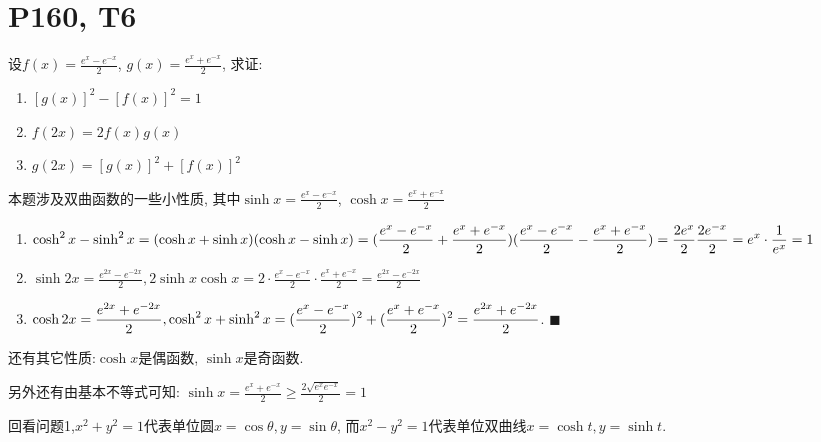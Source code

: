 \documentclass{book}
\begin{document}
    \section{\textcolor[rgb]{0.11,0.65,0.52}{P160, T6}}
    \begin{boxB}
        设$\displaystyle f(x)=\frac{e^x-e^{-x}}{2}$, $\displaystyle g(x)=\frac{e^x+e^{-x}}{2}$, 求证:\par
    \begin{enumerate}
        \item $[g(x)]^2-[f(x)]^2=1$
        \item $f(2x)=2f(x)g(x)$
        \item $g(2x)=[g(x)]^2+[f(x)]^2$
    \end{enumerate}
    \end{boxB}
        本题涉及\textcolor[rgb]{0.38,0.11,0.2}{双曲函数}的一些小性质, 其中$\displaystyle \sinh x = \frac{e^x-e^{-x}}{2}$, $\displaystyle \cosh x = \frac{e^x+e^{-x}}{2}$
    \begin{enumerate}
        \item $\displaystyle \cosh^2 x-\sinh^2x=(\cosh x+\sinh x)(\cosh x-\sinh x)\\=(\frac{e^x-e^{-x}}{2}+\frac{e^x+e^{-x}}{2})(\frac{e^x-e^{-x}}{2}-\frac{e^x+e^{-x}}{2})=\frac{2e^x}{2}\frac{2e^{-x}}{2}=e^x\cdot \frac{1}{e^x}=1$
        \item $\displaystyle \sinh 2x=\frac{e^{2x}-e^{-2x}}{2}, 2\sinh x \cosh x=2\cdot \frac{e^x-e^{-x}}{2}\cdot \frac{e^x+e^{-x}}{2}=\frac{e^{2x}-e^{-2x}}{2}$
        \item $\displaystyle \cosh 2x=\frac{e^{2x}+e^{-2x}}{2}, \cosh^2x+\sinh^2x=(\frac{e^x-e^{-x}}{2})^2+ (\frac{e^x+e^{-x}}{2})^2\\=\frac{e^{2x}+e^{-2x}}{2}$. $\blacksquare$
    \end{enumerate}

    还有其它性质:$\cosh x$是偶函数, $\sinh x$是奇函数. 
        
    另外还有由\textcolor[rgb]{0.75,0.17,0.22}{基本不等式}可知: $\displaystyle \sinh x=\frac{e^x+e^{-x}}{2} \ge \frac{2\sqrt{e^xe^{-x}}}{2}=1$

    \textcolor[rgb]{0.38,0.11,0.2}{回看问题1,$x^2+y^2=1$代表单位圆$x=\cos \theta, y=\sin \theta$, 而$x^2-y^2=1$代表单位双曲线$x=\cosh t, y=\sinh t$.}
    
\end{document}
